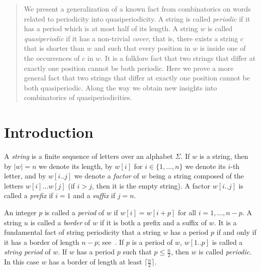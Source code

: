 \documentclass{article}
\begin{document}
\maketitle

  \begin{abstract}
    We present a generalization of a known fact from combinatorics on words related to periodicity 
    into quasiperiodicity.
    A string is called \emph{periodic} if it has a period which is at most half of its length.
    A string $w$ is called \emph{quasiperiodic} if it has a non-trivial \emph{cover},
    that is, there exists a string $c$ that is shorter than $w$ and such that every position in $w$
    is inside one of the occurrences of $c$ in $w$.
    It is a folklore fact that two strings that differ at exactly one position
    cannot be both periodic.
    Here we prove a more general fact that two strings that differ at exactly one position
    cannot be both quasiperiodic.
    Along the way we obtain new insights into combinatorics of quasiperiodicities.
  \end{abstract}


  \section{Introduction}
  A \emph{string} is a finite sequence of letters over an alphabet $\Sigma$.
  If $w$ is a string, then by $|w|=n$ we denote its length, by $w[i]$ for $i \in \{1,\ldots,n\}$ we denote
  its $i$-th letter, and by $w[i..j]$ we denote a \emph{factor} of $w$ being a string composed
  of the letters $w[i] \ldots w[j]$ (if $i>j$, then it is the empty string).
  A factor $w[i..j]$ is called a \emph{prefix} if $i=1$ and a \emph{suffix} if $j=n$.
  
  An integer $p$ is called a \emph{period} of $w$ if $w[i]=w[i+p]$ for all $i=1,\ldots,n-p$.
  A string $u$ is called a \emph{border} of $w$ if it is both a prefix and a suffix of $w$.
  It is a fundamental fact of string periodicity that a string $w$ has a period $p$ if and only if it has a border of length $n-p$;
  see~\cite{AlgorithmsOnStrings,Lothaire}.
  If $p$ is a period of $w$, $w[1..p]$ is called a \emph{string period} of $w$.
  If $w$ has a period $p$ such that $p \le \frac{n}{2}$, then $w$ is called \emph{periodic}.
  In this case $w$ has a border of length at least $\lceil \frac{n}{2} \rceil$.
\end{document}
